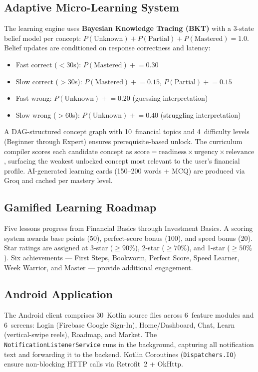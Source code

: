 \documentclass[12pt,a4paper]{article}
\begin{document}
\subsection{Adaptive Micro-Learning System}
The learning engine uses \textbf{Bayesian Knowledge Tracing (BKT)} with a 3-state belief model per concept: $P(\text{Unknown}) + P(\text{Partial}) + P(\text{Mastered}) = 1.0$. Belief updates are conditioned on response correctness and latency:
\begin{itemize}[leftmargin=1.5em]
  \item Fast correct ($< 30$s): $P(\text{Mastered}) \mathrel{+}= 0.30$
  \item Slow correct ($> 30$s): $P(\text{Mastered}) \mathrel{+}= 0.15$, $P(\text{Partial}) \mathrel{+}= 0.15$
  \item Fast wrong: $P(\text{Unknown}) \mathrel{+}= 0.20$ (guessing interpretation)
  \item Slow wrong ($> 60$s): $P(\text{Unknown}) \mathrel{+}= 0.40$ (struggling interpretation)
\end{itemize}
A DAG-structured concept graph with 10~financial topics and 4~difficulty levels (Beginner through Expert) ensures prerequisite-based unlock. The curriculum compiler scores each candidate concept as $\text{score} = \text{readiness} \times \text{urgency} \times \text{relevance}$, surfacing the weakest unlocked concept most relevant to the user's financial profile. AI-generated learning cards (150--200 words + MCQ) are produced via Groq and cached per mastery level.

\subsection{Gamified Learning Roadmap}
Five lessons progress from Financial Basics through Investment Basics. A scoring system awards base points (50), perfect-score bonus (100), and speed bonus (20). Star ratings are assigned at 3-star ($\geq 90\%$), 2-star ($\geq 70\%$), and 1-star ($\geq 50\%$). Six achievements --- First Steps, Bookworm, Perfect Score, Speed Learner, Week Warrior, and Master --- provide additional engagement.

\subsection{Android Application}
The Android client comprises 30~Kotlin source files across 6~feature modules and 6~screens: Login (Firebase Google Sign-In), Home/Dashboard, Chat, Learn (vertical-swipe reels), Roadmap, and Market. The \texttt{NotificationListenerService} runs in the background, capturing all notification text and forwarding it to the backend. Kotlin Coroutines (\texttt{Dispatchers.IO}) ensure non-blocking HTTP calls via Retrofit~2 + OkHttp.
\end{document}
